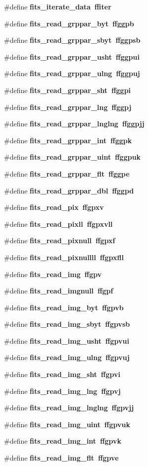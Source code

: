 \begin{CompactItemize}
\#define \bf{fits\_\-iterate\_\-data}~ffiter
\item 
\#define \bf{fits\_\-read\_\-grppar\_\-byt}~ffggpb
\item 
\#define \bf{fits\_\-read\_\-grppar\_\-sbyt}~ffggpsb
\item 
\#define \bf{fits\_\-read\_\-grppar\_\-usht}~ffggpui
\item 
\#define \bf{fits\_\-read\_\-grppar\_\-ulng}~ffggpuj
\item 
\#define \bf{fits\_\-read\_\-grppar\_\-sht}~ffggpi
\item 
\#define \bf{fits\_\-read\_\-grppar\_\-lng}~ffggpj
\item 
\#define \bf{fits\_\-read\_\-grppar\_\-lnglng}~ffggpjj
\item 
\#define \bf{fits\_\-read\_\-grppar\_\-int}~ffggpk
\item 
\#define \bf{fits\_\-read\_\-grppar\_\-uint}~ffggpuk
\item 
\#define \bf{fits\_\-read\_\-grppar\_\-flt}~ffggpe
\item 
\#define \bf{fits\_\-read\_\-grppar\_\-dbl}~ffggpd
\item 
\#define \bf{fits\_\-read\_\-pix}~ffgpxv
\item 
\#define \bf{fits\_\-read\_\-pixll}~ffgpxvll
\item 
\#define \bf{fits\_\-read\_\-pixnull}~ffgpxf
\item 
\#define \bf{fits\_\-read\_\-pixnullll}~ffgpxfll
\item 
\#define \bf{fits\_\-read\_\-img}~ffgpv
\item 
\#define \bf{fits\_\-read\_\-imgnull}~ffgpf
\item 
\#define \bf{fits\_\-read\_\-img\_\-byt}~ffgpvb
\item 
\#define \bf{fits\_\-read\_\-img\_\-sbyt}~ffgpvsb
\item 
\#define \bf{fits\_\-read\_\-img\_\-usht}~ffgpvui
\item 
\#define \bf{fits\_\-read\_\-img\_\-ulng}~ffgpvuj
\item 
\#define \bf{fits\_\-read\_\-img\_\-sht}~ffgpvi
\item 
\#define \bf{fits\_\-read\_\-img\_\-lng}~ffgpvj
\item 
\#define \bf{fits\_\-read\_\-img\_\-lnglng}~ffgpvjj
\item 
\#define \bf{fits\_\-read\_\-img\_\-uint}~ffgpvuk
\item 
\#define \bf{fits\_\-read\_\-img\_\-int}~ffgpvk
\item 
\#define \bf{fits\_\-read\_\-img\_\-flt}~ffgpve

\end{CompactItemize}
